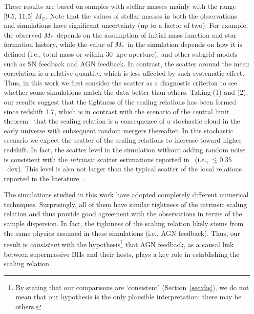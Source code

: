 \documentclass[twocolumn]{aastex631}
\def\smass{{$M_*$}}
\begin{document}
These results are based on samples with stellar masses mainly with the range [9.5, 11.5] $M_{\odot}$. Note that the values of stellar masses in both the observations and simulations have significant uncertainty (up to a factor of two). For example, the observed \smass\ depends on the assumption of initial mass function and star formation history, while the value of \smass\ in the simulation depends on how it is defined (i.e., total mass or within 30~kpc aperture), and other subgrid models such as SN feedback and AGN feedback. In contrast, the scatter around the mean correlation is a relative quantity, which is less affected by such systematic effect. Thus, in this work we first consider the scatter as a diagnostic criterion to see whether some simulations match the data better than others. Taking (1) and (2), our results suggest that the tightness of the scaling relations has been formed since redshift 1.7, which is in contrast with the scenario of the central limit theorem~\citep{Peng2007, Jahnke2011, Hirschmann2010} that the scaling relation is a consequence of a stochastic cloud in the early universe with subsequent random mergers thereafter. In this stochastic scenario we expect the scatter of the scaling relations to increase toward higher redshift. In fact, the scatter level in the simulation without adding random noise is consistent with the {\it intrinsic} scatter estimations reported in~\citet{Ding2020, Li2021b} (i.e., $\lesssim0.35$~dex). This level is also not larger than the typical scatter of the local relations reported in the literature~\citep{Kormendy13, Gul++09, Reines2015}.

The simulations studied in this work have adopted completely different numerical techniques. Surprisingly, all of them have similar tightness of the intrinsic scaling relation and thus provide good agreement with the observations in terms of the sample dispersion. In fact, the tightness of the scaling relation likely stems from the same physics assumed in these simulations (i.e., AGN feedback). Thus, our result is {\it consistent} with the hypothesis\footnote{By stating that our comparisons are `consistent' (Section~\ref{sec:dis}), we do not mean that our hypothesis is the only plausible interpretation; there may be others.} that AGN feedback, as a causal link between supermassive BHs and their hosts, plays a key role in establishing the scaling relation. 
\end{document}
